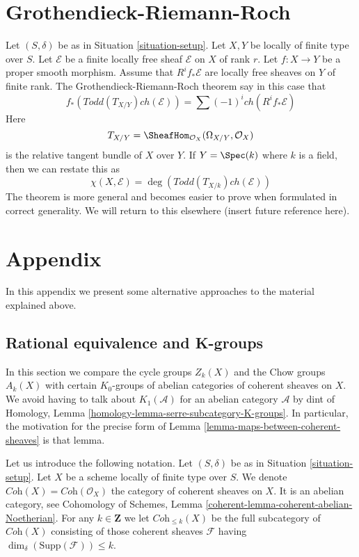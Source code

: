 \section{Grothendieck-Riemann-Roch}
\label{section-grr}

\noindent
Let $(S, \delta)$ be as in
Situation \ref{situation-setup}.
Let $X, Y$ be locally of finite type over $S$.
Let $\mathcal{E}$ be a finite locally free sheaf
${\mathcal E}$ on $X$ of rank $r$.
Let $f : X \to Y$ be a proper smooth morphism.
Assume that $R^if_*\mathcal{E}$ are locally free
sheaves on $Y$ of finite rank.
The Grothendieck-Riemann-Roch theorem say in this
case that
$$
f_*(Todd(T_{X/Y}) ch(\mathcal{E}))
=
\sum (-1)^i ch(R^if_*\mathcal{E})
$$
Here
$$
T_{X/Y} = \SheafHom_{\mathcal{O}_X}(\Omega_{X/Y}, \mathcal{O}_X)
$$
is the relative tangent bundle of $X$ over $Y$. If $Y = \Spec(k)$
where $k$ is a field, then we can restate this as
$$
\chi(X, \mathcal{E}) = \deg(Todd(T_{X/k}) ch(\mathcal{E}))
$$
The theorem is more general and becomes easier to prove
when formulated in correct generality. We will return to
this elsewhere (insert future reference here).





\section{Appendix}
\label{section-appendix-chow}

\noindent
In this appendix we present some alternative approaches to the material
explained above.


\subsection{Rational equivalence and K-groups}
\label{subsection-rational-equivalence-K-groups}

\noindent
In this section we compare the cycle groups $Z_k(X)$ and
the Chow groups $A_k(X)$ with certain $K_0$-groups of
abelian categories of coherent sheaves on $X$. We avoid having
to talk about $K_1(\mathcal{A})$ for an abelian category
$\mathcal{A}$ by dint of
Homology, Lemma \ref{homology-lemma-serre-subcategory-K-groups}.
In particular, the motivation for the precise form of
Lemma \ref{lemma-maps-between-coherent-sheaves} is that lemma.

\medskip\noindent
Let us introduce the following notation.
Let $(S, \delta)$ be as in Situation \ref{situation-setup}.
Let $X$ be a scheme locally of finite type over $S$.
We denote $\textit{Coh}(X) = \textit{Coh}(\mathcal{O}_X)$
the category of coherent sheaves on $X$.
It is an abelian category, see
Cohomology of Schemes, Lemma \ref{coherent-lemma-coherent-abelian-Noetherian}.
For any $k \in \mathbf{Z}$ we let $\textit{Coh}_{\leq k}(X)$
be the full subcategory of $\textit{Coh}(X)$
consisting of those coherent sheaves $\mathcal{F}$
having $\dim_\delta(\text{Supp}(\mathcal{F})) \leq k$.

